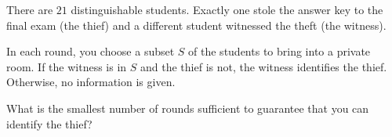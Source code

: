 There are $21$ distinguishable students. Exactly one stole the answer key to the final exam (the thief) and a different student witnessed the theft (the witness).

In each round, you choose a subset $  S  $ of the students to bring into a private room. If the witness is in $  S  $ and the thief is not, the witness identifies the thief. Otherwise, no information is given.

What is the smallest number of rounds sufficient to guarantee that you can identify the thief?
